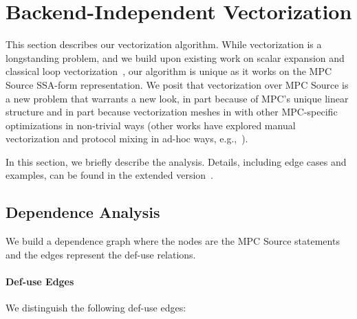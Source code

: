 
\section{Backend-Independent Vectorization}
\label{sec:vectorization}


This section describes our vectorization algorithm. While vectorization is a longstanding problem, 
and we build upon existing work on scalar expansion and classical loop vectorization~\cite{Allen:1987}, 
our algorithm is unique as it works on the MPC Source SSA-form representation. We posit that vectorization 
over MPC Source is a new problem that warrants a new look, in part because of MPC's unique linear 
structure and in part because vectorization meshes in with other MPC-specific optimizations in non-trivial ways
(other works have explored manual vectorization and protocol mixing in ad-hoc ways, e.g.,~\cite{NDSS:DemSchZoh15,CCS:BDKKS18,Ishaq:2019}).

In this section, we briefly describe the analysis. Details, including edge cases and examples, can be found in the extended version~\cite{Anon_TR}.

\subsection{Dependence Analysis}
\label{sec:dependence}

We build a dependence graph where the nodes are the MPC Source statements and the edges represent the def-use relations.

\paragraph{Def-use Edges} We distinguish the following def-use edges:

